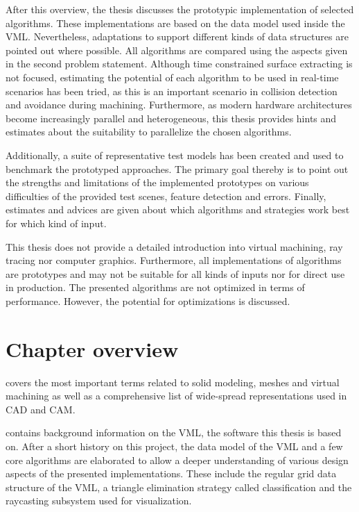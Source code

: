After this overview, the thesis discusses the prototypic implementation of selected algorithms.
These implementations are based on the data model used inside the VML.
Nevertheless, adaptations to support different kinds of data structures are pointed out where possible.
All algorithms are compared using the aspects given in the second problem statement.
Although time constrained surface extracting is not focused, estimating the potential of each algorithm to be used in real-time scenarios has been tried, as this is an important scenario in collision detection and avoidance during machining. %
Furthermore, as modern hardware architectures become increasingly parallel and heterogeneous, this thesis provides hints and estimates about the suitability to parallelize the chosen algorithms.

Additionally, a suite of representative test models has been created and used to benchmark the prototyped approaches.
The primary goal thereby is to point out the strengths and limitations of the implemented prototypes on various difficulties of the provided test scenes, \eg feature detection and errors.
Finally, estimates and advices are given about which algorithms and strategies work best for which kind of input.

This thesis does not provide a detailed introduction into virtual machining, ray tracing nor computer graphics.
Furthermore, all implementations of algorithms are prototypes and may not be suitable for all kinds of inputs nor for direct use in production.
The presented algorithms are not optimized in terms of performance.
However, the potential for optimizations is discussed.


\section{Chapter overview}
\label{sec:chapter_overview}

 covers the most important terms related to solid modeling, meshes and virtual machining as well as a comprehensive list of wide-spread representations used in CAD and CAM.

 contains background information on the VML, the software this thesis is based on.
After a short history on this project, the data model of the VML and a few core algorithms are elaborated to allow a deeper understanding of various design aspects of the presented implementations. These include the regular grid data structure of the VML, a triangle elimination strategy called classification and the raycasting subsystem used for visualization.

